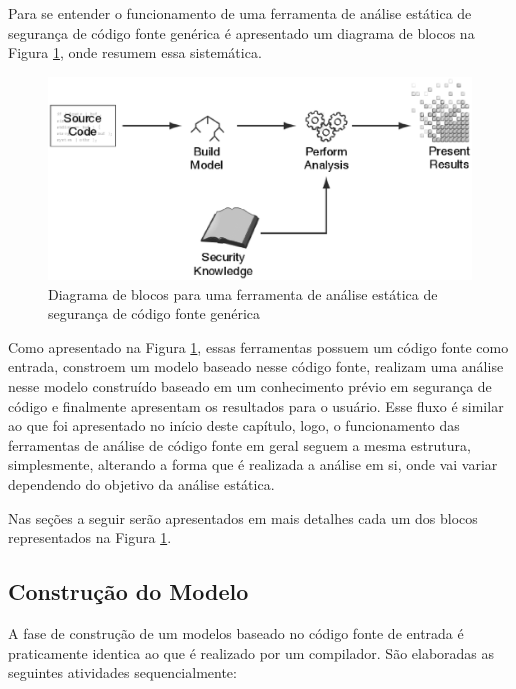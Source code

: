 Para se entender o funcionamento de uma ferramenta de análise estática de
segurança de código fonte genérica é apresentado um diagrama de blocos na Figura
\ref{fig:diagrama_ferramenta_seguranca}, onde 
resumem essa sistemática.

\begin{figure}[h]
  \centering
  \includegraphics[width=1.0\textwidth]
      {figuras/diagrama_ferramenta_seguranca}
      \caption{Diagrama de blocos para uma ferramenta de análise estática de
      segurança de código fonte genérica \cite{chess&west2007}}
  \label{fig:diagrama_ferramenta_seguranca}
\end{figure}

Como apresentado na Figura \ref{fig:diagrama_ferramenta_seguranca}, essas
ferramentas possuem um código fonte como entrada, constroem um modelo baseado
nesse código fonte, realizam uma análise nesse modelo construído baseado em um
conhecimento prévio em segurança de código e finalmente apresentam os resultados
para o usuário. Esse fluxo é similar ao que foi apresentado no início deste
capítulo, logo, o funcionamento das ferramentas de análise de código fonte em
geral seguem a mesma estrutura, simplesmente, alterando a forma que é realizada
a análise em si, onde vai variar dependendo do objetivo da análise estática.

Nas seções a seguir serão apresentados em mais detalhes cada um dos blocos
representados na Figura \ref{fig:diagrama_ferramenta_seguranca}.


\subsection{Construção do Modelo}

A fase de construção de um modelos baseado no código fonte de entrada é
praticamente identica ao que é realizado por um compilador. São elaboradas as
seguintes atividades sequencialmente:

